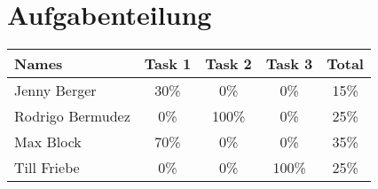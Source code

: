 \newpage
\section{Aufgabenteilung}
\begin{table}[htpb]
    \center
	\label{tab:Aufgabenteilung}
    \begin{tabular}{l|c|c|c|c}
        \large{Names}    & \large{Task 1} & \large{Task 2} & \large{Task 3} & \large{Total} \\ \hline
        Jenny Berger     &           30\% &            0\% &            0\% &          15\% \\
        Rodrigo Bermudez &            0\% &          100\% &            0\% &          25\% \\
        Max Block        &           70\% &            0\% &            0\% &          35\% \\
        Till Friebe      &            0\% &            0\% &          100\% &          25\%
    \end{tabular}
\end{table}
